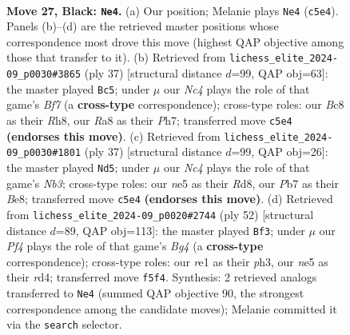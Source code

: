\documentclass[11pt]{article}
\begin{document}
\clearpage

\begin{figure}[p]\centering
\begin{subfigure}{0.46\textwidth}\centering
\resizebox{\linewidth}{!}{%
\newchessgame
\chessboard[
  setfen={r1b3k1/1p2q2p/4r3/pRnQNpp1/8/4P1P1/P4PKP/B3R3 b - - 3 27},
  showmover=false,
  pgfstyle=straightmove, color=movearrow, markmove={c5-e4}
]}
\caption{}
\end{subfigure}\hfill
\begin{subfigure}{0.46\textwidth}\centering
\resizebox{\linewidth}{!}{%
\newchessgame
\chessboard[
  setfen={4k2r/3q1ppp/1pr1p3/pQ6/4nB2/6P1/PP2PbKP/RN3R2 b k - 1 19},
  showmover=false,
  pgfstyle=straightmove, color=movearrow, markmove={f2-c5}
]}
\caption{}
\end{subfigure}
\\[4pt]
\begin{subfigure}{0.46\textwidth}\centering
\resizebox{\linewidth}{!}{%
\newchessgame
\chessboard[
  setfen={r2rb1k1/p3qppp/1np1p3/2R1N3/1Q1P4/6P1/1P2PPBP/R5K1 b - - 14 19},
  showmover=false,
  pgfstyle=straightmove, color=movearrow, markmove={b6-d5}
]}
\caption{}
\end{subfigure}\hfill
\begin{subfigure}{0.46\textwidth}\centering
\resizebox{\linewidth}{!}{%
\newchessgame
\chessboard[
  setfen={1k5r/pp3ppb/2p5/3q1PP1/2NrR1B1/7p/PP2Q2P/R6K w - - 1 27},
  showmover=false,
  pgfstyle=straightmove, color=movearrow, markmove={g4-f3}
]}
\caption{}
\end{subfigure}
\caption{\textbf{Move 27, Black: \texttt{Ne4}.} (a) Our position; Melanie plays \texttt{Ne4} (\texttt{c5e4}). Panels (b)--(d) are the retrieved master positions whose correspondence most drove this move (highest QAP objective among those that transfer to it). (b) Retrieved from \texttt{lichess\_elite\_2024-09\_p0030\#3865} (ply 37) [structural distance $d$=99, QAP obj=63]: the master played \texttt{Bc5}; under $\mu$ our \emph{Nc4} plays the role of that game's \emph{Bf7} (a \textbf{cross-type} correspondence); cross-type roles: our \emph{B}c8 as their \emph{R}h8, our \emph{R}a8 as their \emph{P}h7; transferred move \texttt{c5e4} \textbf{(endorses this move)}. (c) Retrieved from \texttt{lichess\_elite\_2024-09\_p0030\#1801} (ply 37) [structural distance $d$=99, QAP obj=26]: the master played \texttt{Nd5}; under $\mu$ our \emph{Nc4} plays the role of that game's \emph{Nb3}; cross-type roles: our \emph{n}e5 as their \emph{R}d8, our \emph{P}b7 as their \emph{B}e8; transferred move \texttt{c5e4} \textbf{(endorses this move)}. (d) Retrieved from \texttt{lichess\_elite\_2024-09\_p0020\#2744} (ply 52) [structural distance $d$=89, QAP obj=113]: the master played \texttt{Bf3}; under $\mu$ our \emph{Pf4} plays the role of that game's \emph{Bg4} (a \textbf{cross-type} correspondence); cross-type roles: our \emph{r}e1 as their \emph{p}h3, our \emph{n}e5 as their \emph{r}d4; transferred move \texttt{f5f4}. Synthesis: 2 retrieved analogs transferred to \texttt{Ne4} (summed QAP objective 90, the strongest correspondence among the candidate moves); Melanie committed it via the \texttt{search} selector.}
\label{fig:thought-m53}
\end{figure}
\end{document}
